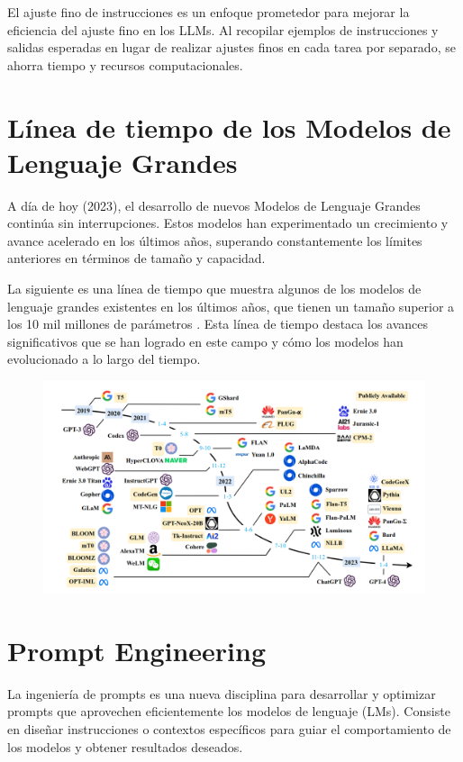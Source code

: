 El ajuste fino de instrucciones es un enfoque prometedor para mejorar la eficiencia del ajuste fino en los LLMs. Al recopilar ejemplos de instrucciones y salidas esperadas en lugar de realizar ajustes finos en cada tarea por separado, se ahorra tiempo y recursos computacionales.

\section{Línea de tiempo de los Modelos de Lenguaje Grandes}
A día de hoy (2023), el desarrollo de nuevos Modelos de Lenguaje Grandes continúa sin interrupciones. Estos modelos han experimentado un crecimiento y avance acelerado en los últimos años, superando constantemente los límites anteriores en términos de tamaño y capacidad.

La siguiente es una línea de tiempo que muestra algunos de los modelos de lenguaje grandes existentes en los últimos años, que tienen un tamaño superior a los 10 mil millones de parámetros \cite{zhao2023survey}. Esta línea de tiempo destaca los avances significativos que se han logrado en este campo y cómo los modelos han evolucionado a lo largo del tiempo.

\begin{figure}[h]
\includegraphics[scale = 0.33]{pics/llmtimeline.png}
\end{figure}



\section{Prompt Engineering}
La ingeniería de prompts es una nueva disciplina para desarrollar y optimizar prompts que aprovechen eficientemente los modelos de lenguaje (LMs). Consiste en diseñar instrucciones o contextos específicos para guiar el comportamiento de los modelos y obtener resultados deseados.

